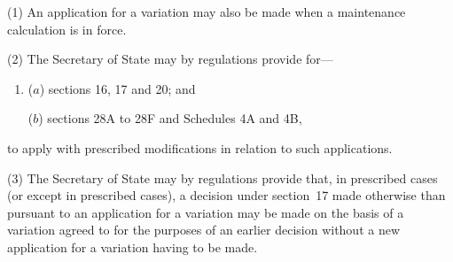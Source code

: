 \documentclass[12pt,a4paper]{article}
\begin{document}
(1) An application for a variation may also be made when a maintenance calculation is in force.

(2) The Secretary of State may by regulations provide for—
\begin{enumerate}\item[]
($a$) sections 16, 17 and 20; and

($b$) sections 28A to 28F and Schedules 4A and 4B,
\end{enumerate}
to apply with prescribed modifications in relation to such applications.

(3) The Secretary of State may by regulations provide that, in prescribed cases (or except in prescribed cases), a decision under section~17 made otherwise than pursuant to an application for a variation may be made on the basis of a variation agreed to for the purposes of an earlier decision without a new application for a variation having to be made.


%
%
%
%
%
%
%
%
%
\end{document}

